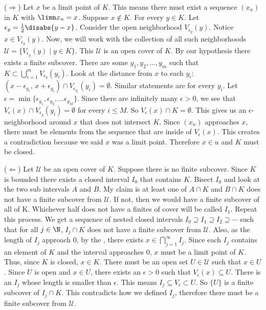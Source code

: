 {    \begin{customframedproof}[linecolor=xgray]
        \begin{proofpart}[xgray]{(\(\Rightarrow\))}
            Let \(x\) be a limit point of \(K\). This means there must exist a sequence \((x_n)\) in \(K\) with \(\limn x_n = x\). Suppose \(x \notin K\). For every \(y \in K\). Let \(\epsilon_y = \frac{1}{2}\disabs{y-x}\). Consider the open neighborhood \(V_{\epsilon_y}(y)\). Notice \(x \in V_{\epsilon_y} (y)\). Now, we will work with the collection of all such neighborhoods \(\mathcal{U} = \{V_{\epsilon_y}(y) \mid y \in K\}\). This \(\mathcal{U}\) is an open cover of \(K\). By our hypothesis there exists a finite subcover. There are some \(y_1,y_2,\dots,y_m\) such that \(K \subset \bigcup_{i = 1}^m V_{\epsilon_y}(y_i)\). Look at the distance from \(x\) to each \(y_i\): \((x - \epsilon_{y_i}\text{, } x + \epsilon_{y_i}) \cap V_{\epsilon_{y_i}} (y_i) = \emptyset\). Similar statements are for every \(y_i\). Let \(\epsilon = \min\{\epsilon_{y_1}, \epsilon_{y_2},\dots \epsilon_{y_M}\}\). Since there are infinitely many \(\epsilon > 0\), we see that \(V_\epsilon(x)\cap V_{\epsilon_y}(y_i) = \emptyset\) for every \(i \leq M\). So \(V_\epsilon (x) \cap K = \emptyset\). This gives us an \(\epsilon\)-neighborhood around \(x\) that does not intersect \(K\). Since \((x_n)\) approaches \(x\), there must be elements from the sequence that are inside of \(V_\epsilon(x)\). This creates a contradiction because we said \(x\) was a limit point. Therefore \(x \in u\) and \(K\) must be closed.
        \end{proofpart}
    \vspace{2mm}
            \begin{proofpart}[xgray]{(\(\Leftarrow\))}
                Let \(\mathcal{U}\) be an open cover of \(K\). Suppose there is no finite subcover. Since \(K\) is bounded there exists a closed interval \(I_0\) that contains \(K\). Bisect \(I_0\) and look at the two sub intervals \(A\) and \(B\). My claim is at least one of \(A \cap K\) and \(B \cap K\) does not have a finite subcover from \(\mathcal{U}\). If not, then we would have a finite subcover of all of K. Whichever half does not have a finites of cover will be called \(I_1\). Repeat this process. We get a sequence of nested closed intervals \(I_0 \supseteq I_1 \supseteq I_2 \supseteq \cdots\) such that for all \(j \in \N\), \(I_j \cap K\) does not have a finite subcover from \(\mathcal{U}\). Also, as the length of \(I_j\) approach 0, by the , there exists \(x \in \bigcap_{j = 1}^{\infty} I_j\). Since each \(I_j\) contains an element of \(K\) and the interval approaches 0, \(x\) must be a limit point of \(K\). Thus, since \(K\) is closed, \(x \in K\). There must be an open set \(U \in \mathcal{U}\) such that \(x \in U\). Since \(U\) is open and \(x \in U\), there exists an \(\epsilon > 0\) such that \(V_\epsilon(x) \subseteq U\). There is an \(I_j\) whose length is smaller than \(\epsilon\). This means \(I_j \subseteq V_\epsilon \subset U\). So \(\{U\}\) is a finite subcover of \(I_j \cap K\). This contradicts how we defined \(I_j\), therefore there must be a finite subcover from \(\mathcal{U}\). \qedhere

\end{proofpart}
\end{customframedproof}}
